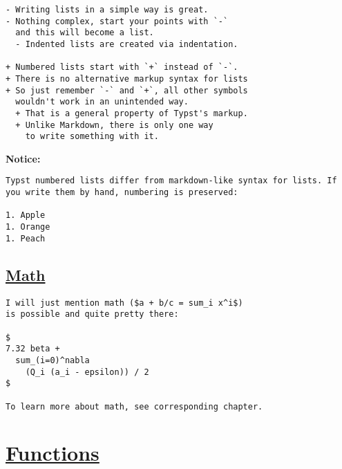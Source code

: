 \begin{verbatim}
- Writing lists in a simple way is great.
- Nothing complex, start your points with `-`
  and this will become a list.
  - Indented lists are created via indentation.

+ Numbered lists start with `+` instead of `-`.
+ There is no alternative markup syntax for lists
+ So just remember `-` and `+`, all other symbols
  wouldn't work in an unintended way.
  + That is a general property of Typst's markup.
  + Unlike Markdown, there is only one way
    to write something with it.
\end{verbatim}

\pandocbounded{}

\textbf{Notice:}

\begin{verbatim}
Typst numbered lists differ from markdown-like syntax for lists. If you write them by hand, numbering is preserved:

1. Apple
1. Orange
1. Peach
\end{verbatim}

\pandocbounded{}

\subsection{\texorpdfstring{\hyperref[math]{Math}}{Math}}\label{math}

\begin{verbatim}
I will just mention math ($a + b/c = sum_i x^i$)
is possible and quite pretty there:

$
7.32 beta +
  sum_(i=0)^nabla
    (Q_i (a_i - epsilon)) / 2
$

To learn more about math, see corresponding chapter.
\end{verbatim}

\pandocbounded{}

\section{\texorpdfstring{\hyperref[functions]{Functions}}{Functions}}\label{functions}

